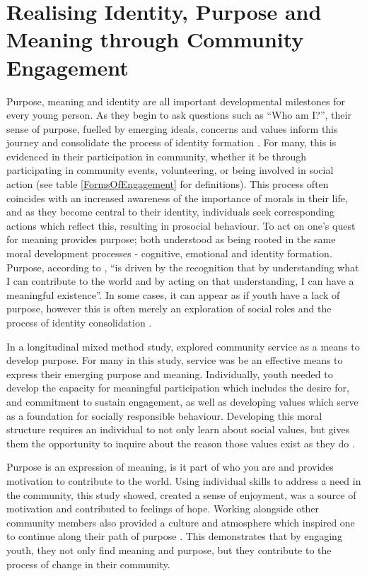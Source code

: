 \section{Realising Identity, Purpose and Meaning through Community Engagement}
Purpose, meaning and identity are all important developmental milestones for every young person. As they begin to ask questions such as “Who am I?”, their sense of purpose, fuelled by emerging ideals, concerns and values inform this journey and consolidate the process of identity formation \citep{Malin2015}. For many, this is evidenced in their participation in community, whether it be through participating in community events, volunteering, or being involved in social action (see table \ref{FormsOfEngagement} for definitions). This process often coincides with an increased awareness of the importance of morals in their life, and as they become central to their identity, individuals seek corresponding actions which reflect this, resulting in prosocial behaviour. To act on one's quest for meaning provides purpose; both understood as being rooted in the same moral development processes - cognitive, emotional and identity formation. Purpose, according to \citet[][p109]{Malin2015}, “is driven by the recognition that by understanding what I can contribute to the world and by acting on that understanding, I can have a meaningful existence”. In some cases, it can appear as if youth have a lack of purpose, however this is often merely an exploration of social roles and the process of identity consolidation \citep{Malin2015}. 

In a longitudinal mixed method study, \citet{Malin2015} explored community service as a means to develop purpose. For many in this study, service was be an effective means to express their emerging purpose and meaning. Individually, youth needed to develop the capacity for meaningful participation which includes the desire for, and commitment to sustain engagement, as well as developing values which serve as a foundation for socially responsible behaviour. Developing this moral structure requires an individual to not only learn about social values, but gives them the opportunity to inquire about the reason those values exist as they do \citep{Malin2015}. 

Purpose is an expression of meaning, is it part of who you are and provides motivation to contribute to the world. Using individual skills to address a need in the community, this study showed, created a sense of enjoyment, was a source of motivation and contributed to feelings of hope. Working alongside other community members also provided a culture and atmosphere which inspired one to continue along their path of purpose \citep{Malin2015}. This demonstrates that by engaging youth, they not only find meaning and purpose, but they contribute to the process of change in their community. 

